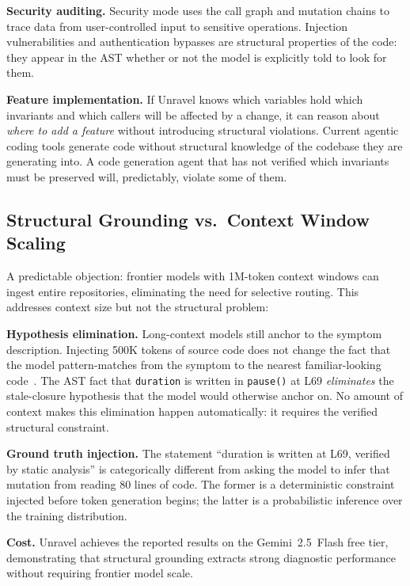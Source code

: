 \documentclass[12pt,a4paper]{article}
\newcommand{\code}[1]{\texttt{\small #1}}
\begin{document}
\textbf{Security auditing.} Security mode uses the call graph and mutation chains to trace
data from user-controlled input to sensitive operations. Injection vulnerabilities and
authentication bypasses are structural properties of the code: they appear in the AST
whether or not the model is explicitly told to look for them.

\textbf{Feature implementation.} If Unravel knows which variables hold which invariants
and which callers will be affected by a change, it can reason about \textit{where to add a
feature} without introducing structural violations. Current agentic coding tools generate
code without structural knowledge of the codebase they are generating into. A code
generation agent that has not verified which invariants must be preserved will, predictably,
violate some of them.

\subsection{Structural Grounding vs.\ Context Window Scaling}

A predictable objection: frontier models with 1M-token context windows can ingest entire
repositories, eliminating the need for selective routing. This addresses context size but
not the structural problem:

\textbf{Hypothesis elimination.} Long-context models still anchor to the symptom
description. Injecting 500K tokens of source code does not change the fact that the model
pattern-matches from the symptom to the nearest familiar-looking code~\cite{zhang2026}.
The AST fact that \code{duration} is written in \code{pause()} at L69 \textit{eliminates}
the stale-closure hypothesis that the model would otherwise anchor on. No amount of context
makes this elimination happen automatically: it requires the verified structural constraint.

\textbf{Ground truth injection.} The statement ``duration is written at L69, verified by
static analysis'' is categorically different from asking the model to infer that mutation
from reading 80 lines of code. The former is a deterministic constraint injected before
token generation begins; the latter is a probabilistic inference over the training
distribution.

\textbf{Cost.} Unravel achieves the reported results on the Gemini~2.5~Flash free tier,
demonstrating that structural grounding extracts strong diagnostic performance without
requiring frontier model scale.
\end{document}
